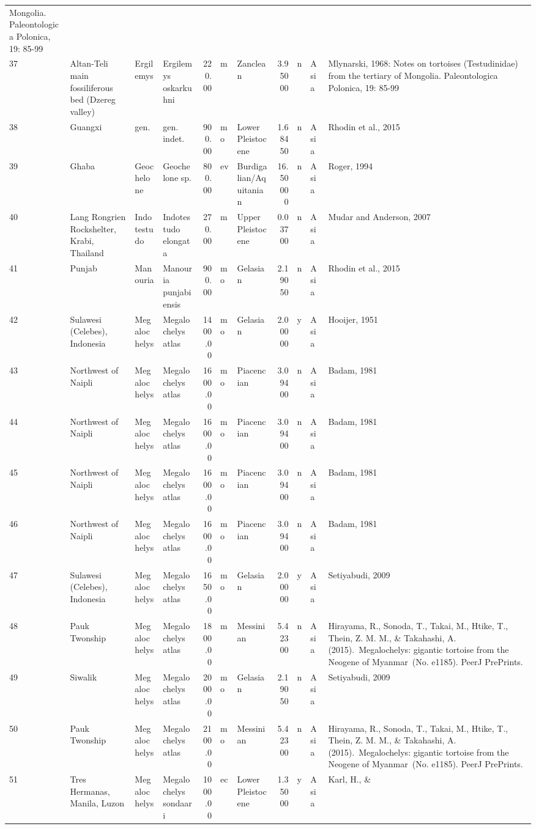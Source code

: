 \documentclass[]{article}
\begin{document}
\begin{longtable}[]{@{}llllrllrlll@{}}
Mongolia. Paleontologica Polonica, 19: 85-99\tabularnewline
37 & Altan-Teli main fossiliferous bed (Dzereg valley) & Ergilemys &
Ergilemys oskarkuhni & 220.00 & m & Zanclean & 3.95000 & n & Asia &
Mlynarski, 1968: Notes on tortoises (Testudinidae) from the tertiary of
Mongolia. Paleontologica Polonica, 19: 85-99\tabularnewline
38 & Guangxi & gen. & gen. indet. & 900.00 & mo & Lower Pleistocene &
1.68450 & n & Asia & Rhodin et al., 2015\tabularnewline
39 & Ghaba & Geochelone & Geochelone sp. & 800.00 & ev &
Burdigalian/Aquitanian & 16.50000 & n & Asia & Roger,
1994\tabularnewline
40 & Lang Rongrien Rockshelter, Krabi, Thailand & Indotestudo &
Indotestudo elongata & 270.00 & m & Upper Pleistocene & 0.03700 & n &
Asia & Mudar and Anderson, 2007\tabularnewline
41 & Punjab & Manouria & Manouria punjabiensis & 900.00 & mo & Gelasian
& 2.19050 & n & Asia & Rhodin et al., 2015\tabularnewline
42 & Sulawesi (Celebes), Indonesia & Megalochelys & Megalochelys atlas &
1400.00 & mo & Gelasian & 2.00000 & y & Asia & Hooijer,
1951\tabularnewline
43 & Northwest of Naipli & Megalochelys & Megalochelys atlas & 1600.00 &
mo & Piacencian & 3.09400 & n & Asia & Badam, 1981\tabularnewline
44 & Northwest of Naipli & Megalochelys & Megalochelys atlas & 1600.00 &
mo & Piacencian & 3.09400 & n & Asia & Badam, 1981\tabularnewline
45 & Northwest of Naipli & Megalochelys & Megalochelys atlas & 1600.00 &
mo & Piacencian & 3.09400 & n & Asia & Badam, 1981\tabularnewline
46 & Northwest of Naipli & Megalochelys & Megalochelys atlas & 1600.00 &
mo & Piacencian & 3.09400 & n & Asia & Badam, 1981\tabularnewline
47 & Sulawesi (Celebes), Indonesia & Megalochelys & Megalochelys atlas &
1650.00 & mo & Gelasian & 2.00000 & y & Asia & Setiyabudi,
2009\tabularnewline
48 & Pauk Twonship & Megalochelys & Megalochelys atlas & 1800.00 & m &
Messinian & 5.42300 & n & Asia & Hirayama, R., Sonoda, T., Takai, M.,
Htike, T., Thein, Z. M. M., \& Takahashi, A. (2015).~Megalochelys:
gigantic tortoise from the Neogene of Myanmar~(No. e1185). PeerJ
PrePrints.\tabularnewline
49 & Siwalik & Megalochelys & Megalochelys atlas & 2000.00 & mo &
Gelasian & 2.19050 & n & Asia & Setiyabudi, 2009\tabularnewline
50 & Pauk Twonship & Megalochelys & Megalochelys atlas & 2100.00 & mo &
Messinian & 5.42300 & n & Asia & Hirayama, R., Sonoda, T., Takai, M.,
Htike, T., Thein, Z. M. M., \& Takahashi, A. (2015).~Megalochelys:
gigantic tortoise from the Neogene of Myanmar~(No. e1185). PeerJ
PrePrints.\tabularnewline
51 & Tres Hermanas, Manila, Luzon & Megalochelys & Megalochelys sondaari
& 1000.00 & ec & Lower Pleistocene & 1.35000 & y & Asia & Karl, H., \&

\end{longtable}
\end{document}
